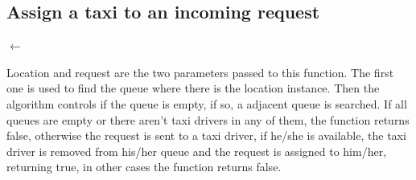 \subsection{Assign a taxi to an incoming request}
\begin{algorithm}[H]
	 {
		\BlankLine
		\queue $\leftarrow$ \;
		\
	}
\end{algorithm}
Location and request are the two parameters passed to this function. The first one is used to find the queue where there is the location instance. Then the algorithm controls if the queue is empty, if so, a adjacent queue is searched. If all queues are empty or there aren't taxi drivers in any of them, the function returns false, otherwise the request is sent to a taxi driver, if he/she is available, the taxi driver is removed from his/her queue and the request is assigned to him/her, returning true, in other cases the function returns false.